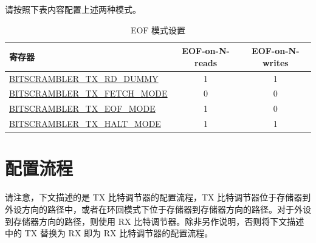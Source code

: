 \documentclass[main\_\_CN.tex]{subfiles}
\begin{document}
请按照下表内容配置上述两种模式。

\begin{table}[H]
\centering
\caption{EOF 模式设置}
\label{tab:bitscrm-settings-for-eof-modes}
\begin{tabular}{|l|c|c|}
\hline\rowcolor{lightgray}
寄存器 & EOF-on-N-reads & EOF-on-N-writes \\
\hline
\hyperref[fielddesc:BITSCRAMBLERTXRDDUMMY]{BITSCRAMBLER\_TX\_RD\_DUMMY} & 1 & 1 \\ \hline
\hyperref[fielddesc:BITSCRAMBLERTXFETCHMODE]{BITSCRAMBLER\_TX\_FETCH\_MODE} & 0 & 0 \\ \hline
\hyperref[fielddesc:BITSCRAMBLERTXEOFMODE]{BITSCRAMBLER\_TX\_EOF\_MODE} & 1 & 0 \\ \hline
\hyperref[fielddesc:BITSCRAMBLERTXHALTMODE]{BITSCRAMBLER\_TX\_HALT\_MODE} & 1 & 1 \\\hline
\end{tabular}
\end{table}


\section{配置流程}
\label{sec:bitscrm-prog-procedures}

请注意，下文描述的是 TX 比特调节器的配置流程，TX 比特调节器位于存储器到外设方向的路径中，或者在环回模式下位于存储器到存储器方向的路径。对于外设到存储器方向的路径，则使用 RX 比特调节器。除非另作说明，否则将下文描述中的 TX 替换为 RX 即为 RX 比特调节器的配置流程。
\end{document}
